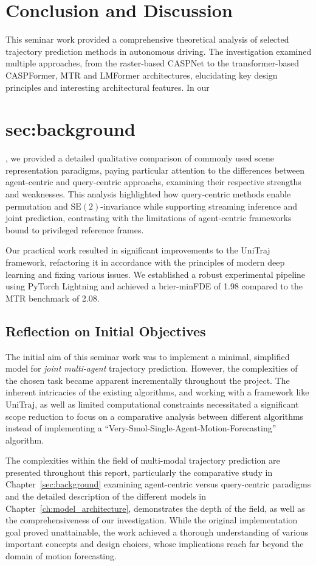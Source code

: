 \section{Conclusion and Discussion}
\label{sec:conclusion}
This seminar work provided a comprehensive theoretical analysis of selected trajectory prediction methods in autonomous driving. The investigation examined multiple approaches, from the raster-based CASPNet to the transformer-based CASPFormer, MTR and LMFormer architectures, elucidating key design principles and interesting architectural features. In our \section{sec:background}, we provided a detailed qualitative comparison of commonly used scene representation paradigms, paying particular attention to the differences between agent-centric and query-centric approachs, examining their respective strengths and weaknesses. This analysis highlighted how query-centric methods enable permutation and $\mathrm{SE}(2)$-invariance while supporting streaming inference and joint prediction, contrasting with the limitations of agent-centric frameworks bound to privileged reference frames.

Our practical work resulted in significant improvements to the UniTraj framework, refactoring it in accordance with the principles of modern deep learning and fixing various issues.
We established a robust experimental pipeline using PyTorch Lightning and achieved a brier-minFDE of 1.98 compared to the MTR benchmark of 2.08.


\subsection{Reflection on Initial Objectives}
\label{sec:conclusion_objectives}

The initial aim of this seminar work was to implement a minimal, simplified model for \emph{joint multi-agent} trajectory prediction. However, the complexities of the chosen task became apparent incrementally throughout the project.
The inherent intricacies of the existing algorithms, and working with a framework like UniTraj, as well as limited computational constraints necessitated a significant scope reduction to focus on a comparative analysis between different algorithms instead of implementing a ``Very-Smol-Single-Agent-Motion-Forecasting'' algorithm.

The complexities within the field of multi-modal trajectory prediction are presented throughout this report, particularly the comparative study in Chapter~\ref{sec:background} examining agent-centric versus query-centric paradigms and the detailed description of the different models in Chapter~\ref{ch:model_architecture}, demonstrates the depth of the field, as well as the comprehensiveness of our investigation. While the original implementation goal proved unattainable, the work achieved a thorough understanding of various important concepts and design choices, whose implications reach far beyond the domain of motion forecasting.


